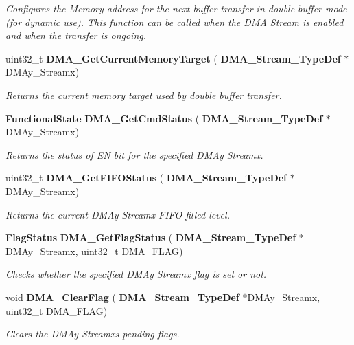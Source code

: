 \begin{DoxyCompactItemize}
\begin{DoxyCompactList}\small\item\em Configures the Memory address for the next buffer transfer in double buffer mode (for dynamic use). This function can be called when the D\+MA Stream is enabled and when the transfer is ongoing. \end{DoxyCompactList}\item 
uint32\+\_\+t \textbf{ D\+M\+A\+\_\+\+Get\+Current\+Memory\+Target} (\textbf{ D\+M\+A\+\_\+\+Stream\+\_\+\+Type\+Def} $\ast$D\+M\+Ay\+\_\+\+Streamx)
\begin{DoxyCompactList}\small\item\em Returns the current memory target used by double buffer transfer. \end{DoxyCompactList}\item 
\textbf{ Functional\+State} \textbf{ D\+M\+A\+\_\+\+Get\+Cmd\+Status} (\textbf{ D\+M\+A\+\_\+\+Stream\+\_\+\+Type\+Def} $\ast$D\+M\+Ay\+\_\+\+Streamx)
\begin{DoxyCompactList}\small\item\em Returns the status of EN bit for the specified D\+M\+Ay Streamx. \end{DoxyCompactList}\item 
uint32\+\_\+t \textbf{ D\+M\+A\+\_\+\+Get\+F\+I\+F\+O\+Status} (\textbf{ D\+M\+A\+\_\+\+Stream\+\_\+\+Type\+Def} $\ast$D\+M\+Ay\+\_\+\+Streamx)
\begin{DoxyCompactList}\small\item\em Returns the current D\+M\+Ay Streamx F\+I\+FO filled level. \end{DoxyCompactList}\item 
\textbf{ Flag\+Status} \textbf{ D\+M\+A\+\_\+\+Get\+Flag\+Status} (\textbf{ D\+M\+A\+\_\+\+Stream\+\_\+\+Type\+Def} $\ast$D\+M\+Ay\+\_\+\+Streamx, uint32\+\_\+t D\+M\+A\+\_\+\+F\+L\+AG)
\begin{DoxyCompactList}\small\item\em Checks whether the specified D\+M\+Ay Streamx flag is set or not. \end{DoxyCompactList}\item 
void \textbf{ D\+M\+A\+\_\+\+Clear\+Flag} (\textbf{ D\+M\+A\+\_\+\+Stream\+\_\+\+Type\+Def} $\ast$D\+M\+Ay\+\_\+\+Streamx, uint32\+\_\+t D\+M\+A\+\_\+\+F\+L\+AG)
\begin{DoxyCompactList}\small\item\em Clears the D\+M\+Ay Streamx\textquotesingle{}s pending flags. \end{DoxyCompactList}\item 

\end{DoxyCompactItemize}
